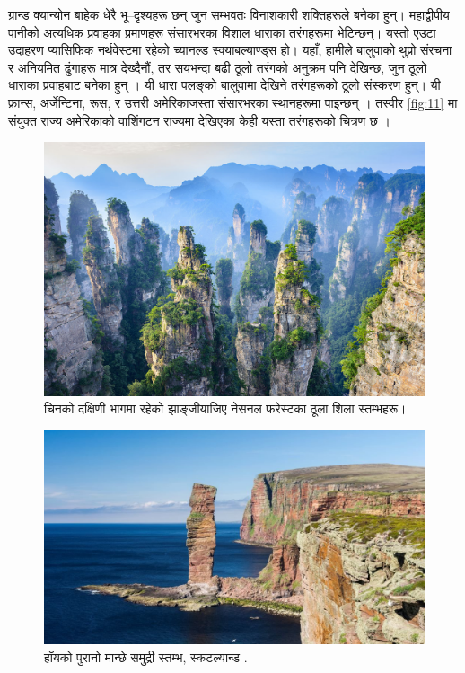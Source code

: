 \documentclass[10pt,twocolumn,letterpaper]{article}
\begin{document}
ग्रान्ड क्यान्योन बाहेक धेरै भू–दृश्यहरू छन् जुन सम्भवतः विनाशकारी शक्तिहरूले बनेका हुन्। महाद्वीपीय पानीको अत्यधिक प्रवाहका प्रमाणहरू संसारभरका विशाल धाराका तरंगहरूमा भेटिन्छन्। यस्तो एउटा उदाहरण प्यासिफिक नर्थवेस्टमा रहेको च्यानल्ड स्क्याबल्याण्ड्स हो। यहाँ, हामीले बालुवाको थुप्रो संरचना र अनियमित ढुंगाहरू मात्र देख्दैनौं, तर सयभन्दा बढी ठूलो तरंगको अनुक्रम पनि देखिन्छ, जुन ठूलो धाराका प्रवाहबाट बनेका हुन् \cite{78,79}। यी धारा पलङ्को बालुवामा देखिने तरंगहरूको ठूलो संस्करण हुन्। यी फ्रान्स, अर्जेन्टिना, रूस, र उत्तरी अमेरिकाजस्ता संसारभरका स्थानहरूमा पाइन्छन् \cite{81}। तस्वीर \ref{fig:11} मा संयुक्त राज्य अमेरिकाको वाशिंगटन राज्यमा देखिएका केही यस्ता तरंगहरूको चित्रण छ \cite{80}।

\begin{figure}[b]
\begin{center}

   \includegraphics[width=1\linewidth]{zhangjiajie.jpg}
\end{center}
   \caption{चिनको दक्षिणी भागमा रहेको झाङ्जीयाजिए नेसनल फरेस्टका ठूला शिला स्तम्भहरू।}
\label{fig:12}
\label{fig:onecol}
\end{figure}

\begin{figure}[b]
\begin{center}

   \includegraphics[width=1\linewidth]{hoy.jpg}
\end{center}
   \caption{हॉयको पुरानो मान्छे समुद्री स्तम्भ, स्कटल्यान्ड \cite{83}.}
\label{fig:13}
\label{fig:onecol}
\end{figure}
\end{document}
